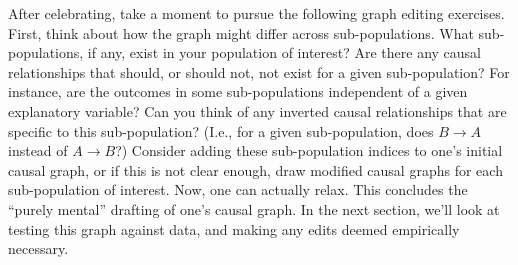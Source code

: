 After celebrating, take a moment to pursue the following graph editing exercises.
First, think about how the graph might differ across sub-populations.
What sub-populations, if any, exist in your population of interest?
Are there any causal relationships that should, or should not, not exist for a given sub-population?
For instance, are the outcomes in some sub-populations independent of a given explanatory variable?
Can you think of any inverted causal relationships that are specific to this sub-population?
(I.e., for a given sub-population, does $B \rightarrow A$ instead of $A \rightarrow B$?)
Consider adding these sub-population indices to one's initial causal graph, or if this is not clear enough, draw modified causal graphs for each sub-population of interest.
Now, one can actually relax.
This concludes the ``purely mental'' drafting of one's causal graph.
In the next section, we'll look at testing this graph against data, and making any edits deemed empirically necessary.
